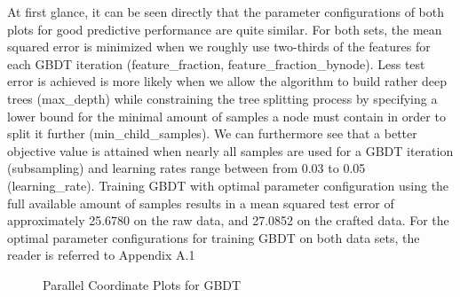 At first glance, it can be seen directly that the parameter configurations of both plots for good predictive performance are quite similar. For both sets, the mean squared error is minimized when we roughly use two-thirds of the features for each GBDT iteration (feature\_fraction, feature\_fraction\_bynode). Less test error is achieved is more likely when we allow the algorithm to build rather deep trees (max\_depth) while constraining the tree splitting process by specifying a lower bound for the minimal amount of samples a node must contain in order to split it further (min\_child\_samples). We can furthermore see that a better objective value is attained when nearly all samples are used for a GBDT iteration (subsampling) and learning rates range between from 0.03 to 0.05 (learning\_rate).
Training GBDT with optimal parameter configuration using the full available amount of samples results in a mean squared test error of approximately 25.6780 on the raw data, and 27.0852 on the crafted data.
For the optimal parameter configurations for training GBDT on both data sets, the reader is referred to Appendix A.1 
\begin{figure}[h]
	\centering
	\caption{Parallel Coordinate Plots for GBDT}
	\label{fig:GBDT_ParallelPlot}
\end{figure}

